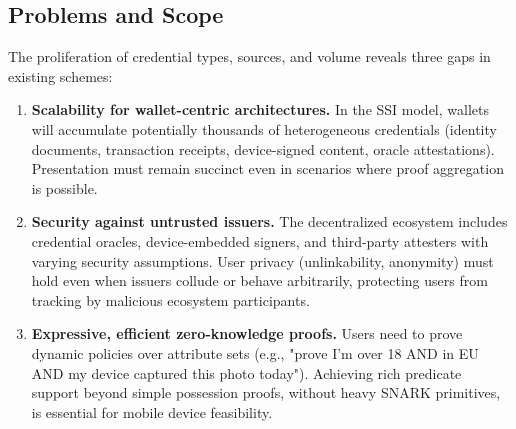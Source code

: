 




\subsection{Problems and Scope}

The proliferation of credential types, sources, and volume reveals three gaps in existing schemes:

\begin{enumerate}
   \item \textbf{Scalability for wallet-centric architectures.} In the SSI model, wallets will accumulate potentially thousands of heterogeneous credentials (identity documents, transaction receipts, device-signed content, oracle attestations). Presentation must remain succinct even in scenarios where proof aggregation is possible.

    \item \textbf{Security against untrusted issuers.} The decentralized ecosystem includes credential oracles, device-embedded signers, and third-party attesters with varying security assumptions. User privacy (unlinkability, anonymity) must hold even when issuers collude or behave arbitrarily, protecting users from tracking by malicious ecosystem participants.

    \item \textbf{Expressive, efficient zero-knowledge proofs.} Users need to prove dynamic policies over attribute sets (e.g., "prove I'm over 18 AND in EU AND my device captured this photo today"). Achieving rich predicate support beyond simple possession proofs, without heavy SNARK primitives, is essential for mobile device feasibility.

\end{enumerate}

